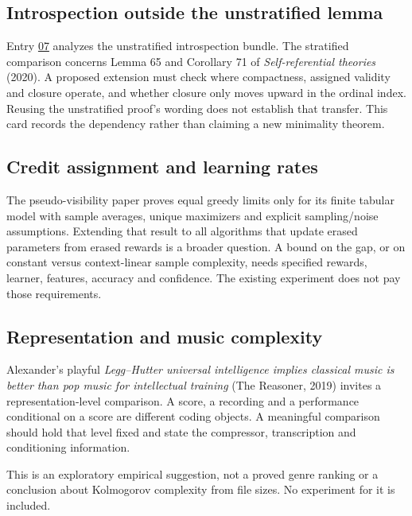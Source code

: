 \documentclass[
  11pt,
  letterpaper,
]{article}
\begin{document}
\subsection{Introspection outside the unstratified
lemma}\label{introspection-outside-the-unstratified-lemma}

Entry
\href{../07-minimal-introspection-bundle/minimal-introspection-bundle.pdf}{07}
analyzes the unstratified introspection bundle. The stratified
comparison concerns Lemma 65 and Corollary 71 of \emph{Self-referential
theories} (2020). A proposed extension must check where compactness,
assigned validity and closure operate, and whether closure only moves
upward in the ordinal index. Reusing the unstratified proof's wording
does not establish that transfer. This card records the dependency
rather than claiming a new minimality theorem.

\subsection{Credit assignment and learning
rates}\label{credit-assignment-and-learning-rates}

The pseudo-visibility paper proves equal greedy limits only for its
finite tabular model with sample averages, unique maximizers and
explicit sampling/noise assumptions. Extending that result to all
algorithms that update erased parameters from erased rewards is a
broader question. A bound on the gap, or on constant versus
context-linear sample complexity, needs specified rewards, learner,
features, accuracy and confidence. The existing experiment does not pay
those requirements.

\subsection{Representation and music
complexity}\label{representation-and-music-complexity}

Alexander's playful \emph{Legg--Hutter universal intelligence implies
classical music is better than pop music for intellectual training} (The
Reasoner, 2019) invites a representation-level comparison. A score, a
recording and a performance conditional on a score are different coding
objects. A meaningful comparison should hold that level fixed and state
the compressor, transcription and conditioning information.

This is an exploratory empirical suggestion, not a proved genre ranking
or a conclusion about Kolmogorov complexity from file sizes. No
experiment for it is included.
\end{document}
